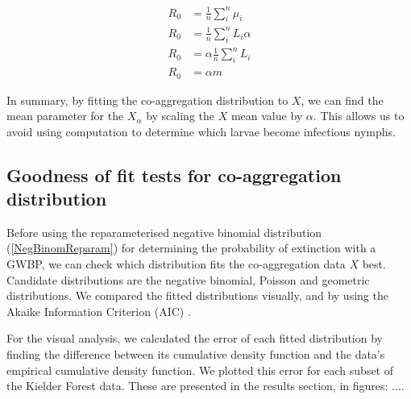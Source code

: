 \documentclass{article}
\begin{document}
\begin{align}\label{FindingR0FromCoaggregationMean}
    R_0 &= \frac{1}{n} \sum_i^n \mu_i \nonumber \\
    R_0 &= \frac{1}{n} \sum_i^n L_i \alpha \nonumber \\
    R_0 &= \alpha \frac{1}{n} \sum_i^n L_i \nonumber \\
    R_0 &= \alpha m
\end{align}

In summary, by fitting the co-aggregation distribution to $ X $, we can find the mean parameter for the $ X_\alpha $ by scaling the $ X $ mean value by $ \alpha $. This allows us to avoid using computation to determine which larvae become infectious nymphs.

\subsection{Goodness of fit tests for co-aggregation distribution}

Before using the reparameterised negative binomial distribution (\ref{NegBinomReparam}) for determining the probability of extinction with a GWBP, we can check which distribution fits the co-aggregation data $ X $ best. Candidate distributions are the negative binomial, Poisson and geometric distributions. We compared the fitted distributions visually, and by using the Akaike Information Criterion (AIC) \cite{LloydSmith2005}.

For the visual analysis, we calculated the error of each fitted distribution by finding the difference between its cumulative density function and the data's empirical cumulative density function. We plotted this error for each subset of the Kielder Forest data. These are presented in the results section, in figures: .... 
\end{document}
